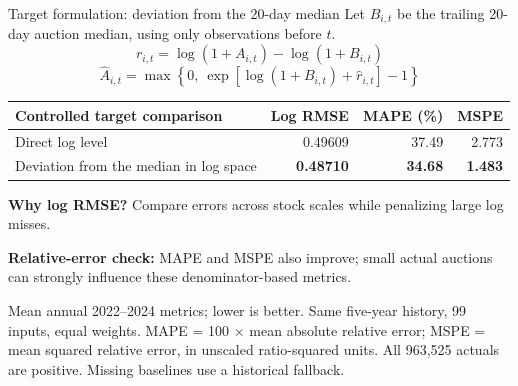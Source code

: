 \documentclass[aspectratio=169,11pt]{beamer}
\newcommand{\source}[1]{\par\vfill{\fontsize{7.5}{9}\selectfont\color{Muted}#1\par}}
\begin{document}
\begin{frame}{Target formulation: deviation from the 20-day median}
Let $B_{i,t}$ be the trailing 20-day auction median, using only observations before $t$.
\[
 r_{i,t}=\log(1+A_{i,t})-\log(1+B_{i,t})
\]
\[
 \widehat A_{i,t}=\max\!\left\{0,\ \exp\!\left[\log(1+B_{i,t})+\widehat r_{i,t}\right]-1\right\}
\]
\medskip
\small
\begin{tabularx}{\textwidth}{@{}Y r r r@{}}
\toprule
\textbf{Controlled target comparison} & \textbf{Log RMSE} & \textbf{MAPE (\%)} & \textbf{MSPE}\\
\midrule
Direct log level & 0.49609 & 37.49 & 2.773\\[0.4em]
Deviation from the median in log space & \textbf{0.48710} & \textbf{34.68} & \textbf{1.483}\\
\bottomrule
\end{tabularx}
\par\medskip
\textbf{Why log RMSE?} Compare errors across stock scales while penalizing large log misses.\par\smallskip
\textbf{Relative-error check:} MAPE and MSPE also improve; small actual auctions can strongly influence these denominator-based metrics.
\source{Mean annual 2022--2024 metrics; lower is better. Same five-year history, 99 inputs, equal weights. MAPE = 100 $\times$ mean absolute relative error; MSPE = mean squared relative error, in unscaled ratio-squared units. All 963,525 actuals are positive. Missing baselines use a historical fallback.}
\end{frame}
\end{document}
